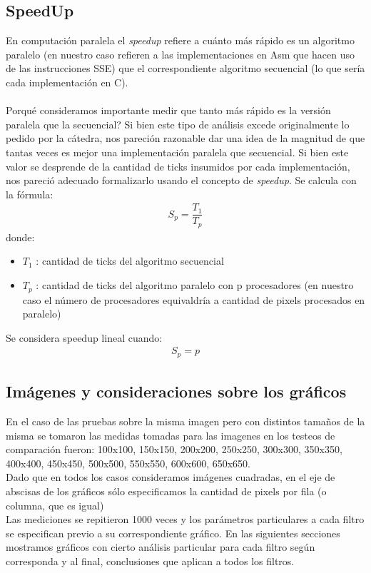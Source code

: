 \subsection{SpeedUp}
\indent En computaci\'on paralela el \textit{speedup} refiere a cu\'anto m\'as r\'apido es un algoritmo paralelo (en nuestro caso refieren a las implementaciones en Asm que hacen uso de las instrucciones SSE) que el correspondiente algoritmo secuencial (lo que ser\'ia cada implementaci\'on en C).\\\\
Porqu\'e consideramos importante medir que tanto m\'as r\'apido es la versi\'on paralela que la secuencial? Si bien este tipo de an\'alisis excede originalmente lo pedido por la c\'atedra, nos pareci\'on razonable dar una idea de la magnitud de que tantas veces es mejor una implementaci\'on paralela que secuencial. Si bien este valor se desprende de la cantidad de ticks insumidos por cada implementaci\'on, nos pareci\'o adecuado formalizarlo usando el concepto de \textit{speedup}. Se calcula con la f\'ormula:\\
\begin{align}
S_{p} = \dfrac{T_{1}} {T_{p}}
\end{align}
donde:\\
\begin{itemize}
	\item $T_{1}$ : cantidad de ticks del algoritmo secuencial
	\item $T_{p}$ : cantidad de ticks del algoritmo paralelo con p procesadores (en nuestro caso el n\'umero de procesadores equivaldr\'ia a cantidad de pixels procesados en paralelo)
\end{itemize}
Se considera speedup lineal cuando: \\
\begin{align}
S_{p} = p
\end{align}


\subsection{Im\'agenes y consideraciones sobre los gr\'aficos}
 En el caso de las pruebas sobre la misma imagen pero con distintos tamaños de la misma se tomaron las medidas tomadas para las imagenes en los testeos de comparación fueron:
	100x100, 150x150, 200x200, 250x250, 300x300, 350x350, 400x400, 450x450, 500x500, 550x550, 600x600, 650x650.\\

\indent Dado que en todos los casos consideramos im\'agenes cuadradas, en el eje de abscisas de los gr\'aficos s\'olo especificamos la cantidad de pixels por fila (o columna, que es igual)\\
\indent Las mediciones se repitieron 1000 veces y los par\'ametros particulares a cada filtro se especifican previo a su correspondiente gr\'afico. 
En las siguientes secciones mostramos gr\'aficos con cierto an\'alisis particular para cada filtro seg\'un corresponda y al final, conclusiones que aplican a todos los filtros.

